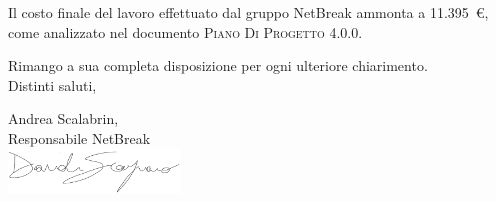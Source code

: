\documentclass[11pt,a4paper]{letter}
\begin{document}
\begin{letter}
	Il costo finale del lavoro effettuato dal gruppo NetBreak ammonta a \hbox{11.395 \euro{}}, come analizzato nel documento \textsc{Piano Di Progetto 4.0.0}.

\noindent Rimango a sua completa disposizione per ogni ulteriore chiarimento.\\
Distinti saluti,\\
\closing{Andrea Scalabrin,\\ Responsabile NetBreak\\ \includegraphics[width=1.8in]{DS.png}}


\end{letter}
\end{document}
